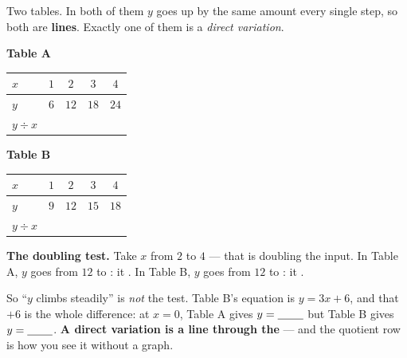 \documentclass[10pt]{article}
\begin{document}
\begin{hookbox}
Two tables. In both of them $y$ goes up by the same amount every single step, so both are
\textbf{lines}. Exactly one of them is a \emph{direct variation}.
\begin{center}
\begin{minipage}{0.46\linewidth}\centering
\textbf{Table A}\\[2pt]
\renewcommand{\arraystretch}{1.3}
\begin{tabular}{|l|c|c|c|c|}
\hline
\rowcolor{forestbg}
$x$ & $1$ & $2$ & $3$ & $4$ \\ \hline
$y$ & $6$ & $12$ & $18$ & $24$ \\ \hline
$y\div x$ & & & & \\ \hline
\end{tabular}
\end{minipage}\hfill
\begin{minipage}{0.46\linewidth}\centering
\textbf{Table B}\\[2pt]
\renewcommand{\arraystretch}{1.3}
\begin{tabular}{|l|c|c|c|c|}
\hline
\rowcolor{forestbg}
$x$ & $1$ & $2$ & $3$ & $4$ \\ \hline
$y$ & $9$ & $12$ & $15$ & $18$ \\ \hline
$y\div x$ & & & & \\ \hline
\end{tabular}
\end{minipage}
\end{center}
\vspace{-2pt}
\textbf{The doubling test.} Take $x$ from $2$ to $4$ --- that is doubling the input.
In Table A, $y$ goes from $12$ to \blank{1.0cm}: it \blank{2.4cm}.
In Table B, $y$ goes from $12$ to \blank{1.0cm}: it \blank{2.4cm}.

\vspace{3pt}
So ``$y$ climbs steadily'' is \emph{not} the test. Table B's equation is $y=3x+6$, and that
$+6$ is the whole difference: at $x=0$, Table A gives $y=\blank{0.8cm}$ but Table B gives
$y=\blank{0.8cm}$. \textbf{A direct variation is a line through the \blank{1.8cm}} --- and the
quotient row is how you see it without a graph.
\end{hookbox}
\end{document}
